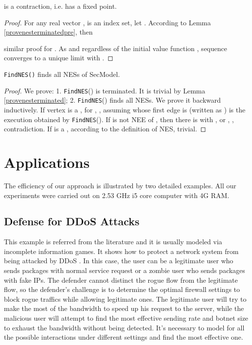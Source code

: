 \documentclass[10pt, conference, compsocconf]{IEEEtran}
\begin{document}
\begin{Lemma}
\label{provenesterminated}
 is a contraction, i.e.  has a fixed point.
\end{Lemma}
\begin{proof}
For any real vector ,  is an index set, let . According to Lemma \ref{provenesterminatedpre}, then

similar proof for . As  and regardless of the initial value function , sequence  converges to a unique limit  with .
\end{proof}

\begin{Theorem}
\label{correctness}
\verb"FindNES()" finds all {\rm NESs} of {\rm SecModel}.
\end{Theorem}
\begin{proof}
We prove:
1. \verb"FindNES"() is terminated. It is trivial
by Lemma \ref{provenesterminated};
2. \verb"FindNES"() finds all NESs. We prove it backward inductively. If vertex  is a , for , , assuming  whose first edge is  (written as ) is the execution obtained by \verb"FindNES"(). If  is not \textrm{NEE} of , then there is  with
,  or
, , contradiction.
If  is a , according to the definition of NES, trivial.
\end{proof}


\section{Applications}
The efficiency of our approach is illustrated by two detailed examples.
All our experiments were carried out on 2.53 GHz i5 core computer with 4G RAM.

\subsection{Defense for DDoS Attacks}
This example is referred from the literature \cite{harkeerat} and it is usually modeled via incomplete information games.
It shows how to protect a network system from being attacked by DDoS \cite{david}.
In this case, the user can be a legitimate user who sends packages with normal service request or a zombie user who sends packages with fake IPs. The defender cannot distinct the rogue flow from the legitimate flow, so the defender's challenge is to determine the optimal firewall settings to block rogue traffics while allowing legitimate ones.
The legitimate user will try to make the most of the bandwidth to speed up his request to the server, while the malicious user will attempt to find the most effective sending rate and botnet size to exhaust the bandwidth without being detected.
It's necessary to model for all the possible interactions under different settings and find the most effective one.
\end{document}
